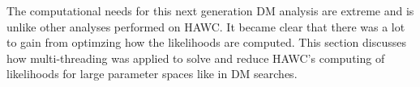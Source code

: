 The computational needs for this next generation DM analysis are extreme and is unlike other analyses performed on HAWC.
It became clear that there was a lot to gain from optimzing how the likelihoods are computed.
This section discusses how multi-threading was applied to solve and reduce HAWC's computing of likelihoods for large parameter spaces like in DM searches.

\subsection{}\label{sec:gd_joint_llh}
